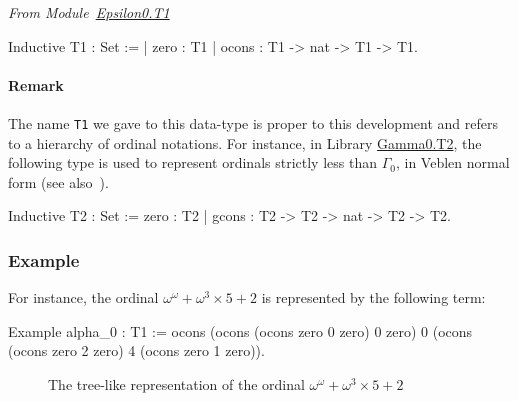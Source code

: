 \vspace{4pt}
\noindent\emph{From Module~\href{../theories/html/hydras.Epsilon0.T1.html\#T1}{Epsilon0.T1}}

\label{types:T1}


\begin{Coqsrc}
Inductive T1 : Set  :=
| zero : T1
| ocons : T1 -> nat -> T1 -> T1.
\end{Coqsrc}



\paragraph{Remark}
The name \texttt{T1} we gave to this data-type  is proper to this development and refers
to a hierarchy of ordinal notations. For instance, in Library \href{../theories/html/hydras.Gamma0.T2.html}{Gamma0.T2},  the following type is used to represent ordinals strictly less than \(\Gamma_0\),  in Veblen normal form (see also~\cite{schutte}).
\noindent
\begin{Coqsrc}
Inductive T2 : Set :=
  zero : T2
| gcons : T2 -> T2 -> nat -> T2 -> T2.
\end{Coqsrc}

\subsubsection{Example}

\label{alpha0-def}
For instance, the ordinal  $\omega^\omega+\omega^3\times 5+2$ is represented by the following term:

\begin{Coqsrc}
Example alpha_0 : T1 :=
  ocons (ocons (ocons zero 0 zero)
               0
               zero)
        0
       (ocons (ocons zero 2 zero)
              4
              (ocons zero 1 zero)).
\end{Coqsrc}


\begin{figure}[htb]
\centering
{}

\caption{The tree-like representation of the ordinal $\omega^\omega+\omega^3\times 5 +2$\label{fig:cnf-tree}}

\end{figure}



